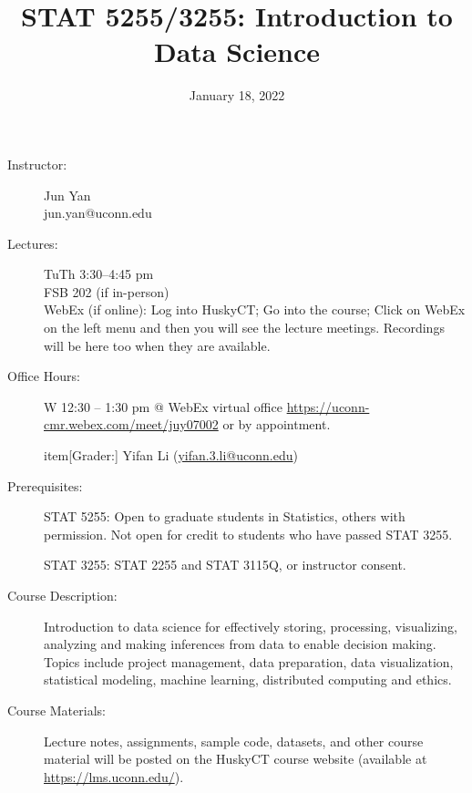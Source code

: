 \documentclass{article}
\begin{document}

\title{STAT 5255/3255: Introduction to Data Science}
\date{January 18, 2022}

\maketitle

\thispagestyle{fancy}

\begin{multicols}{2}
\begin{description}
\item[Instructor:]
  Jun Yan\\
  jun.yan@uconn.edu

\item[Lectures:] 
  TuTh 3:30--4:45 pm\\
  FSB 202 (if in-person)\\
  WebEx (if online):  
  Log into HuskyCT; Go into the course; Click on WebEx on the left menu and
  then you will see the lecture meetings. Recordings will be here too when
  they are available.

\item[Office Hours:] 
  W 12:30 -- 1:30 pm @ WebEx virtual office
  \url{https://uconn-cmr.webex.com/meet/juy07002}
  or by appointment.

item[Grader:] Yifan Li (\href{mailto:
   yifan.3.li@uconn.edu}{yifan.3.li@uconn.edu})
  
\item[Prerequisites:]
  STAT 5255: Open to graduate students in Statistics, others with
  permission. Not open for credit to students who have passed STAT
  3255.

  STAT 3255: STAT 2255 and STAT 3115Q, or instructor consent.
    
\item[Course Description:]
  Introduction to data science for effectively storing, processing,
  visualizing, analyzing and making inferences from data to enable
  decision making. Topics include project management, data
  preparation, data visualization, statistical modeling, machine
  learning, distributed computing and ethics.
  
\item[Course Materials:]
  Lecture notes, assignments, sample code, datasets, and other course
  material will be posted on the HuskyCT course website (available at
  \url{https://lms.uconn.edu/}).
  

\end{description}
\end{multicols}
\end{document}
